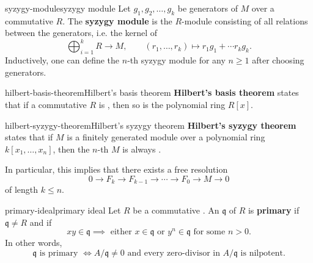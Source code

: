 \begin{topic}{syzygy-module}{syzygy module}
    Let $g_1, g_2, \ldots, g_k$ be generators of  $M$ over a commutative  $R$. The \textbf{syzygy module} is the $R$-module consisting of all relations between the generators, i.e. the kernel of
    \[ \bigoplus_{i = 1}^{k} R \to M, \qquad (r_1, \ldots, r_k) \mapsto r_1 g_1 + \cdots r_k g_k . \]
    Inductively, one can define the $n$-th syzygy module for any $n \ge 1$ after choosing generators.
\end{topic}

\begin{topic}{hilbert-basis-theorem}{Hilbert's basis theorem}
    \textbf{Hilbert's basis theorem} states that if a commutative  $R$ is , then so is the polynomial ring $R[x]$.
\end{topic}


\begin{topic}{hilbert-syzygy-theorem}{Hilbert's syzygy theorem}
    \textbf{Hilbert's syzygy theorem} states that if $M$ is a finitely generated module over a polynomial ring $k[x_1, \ldots, x_n]$, then the $n$-th  $M$ is always .
    
    In particular, this implies that there exists a free resolution
    \[ 0 \to F_k \to F_{k - 1} \to \cdots \to F_0 \to M \to 0 \]
    of length $k \le n$.
\end{topic}

\begin{topic}{primary-ideal}{primary ideal}
    Let $R$ be a commutative . An  $\mathfrak{q}$ of $R$ is \textbf{primary} if $\mathfrak{q} \ne R$ and if
    \[ xy \in \mathfrak{q} \implies \text{ either } x \in \mathfrak{q} \text{ or } y^n \in \mathfrak{q} \text{ for some } n > 0 . \]
    In other words,
    \[ \mathfrak{q} \text{ is primary } \iff A / \mathfrak{q} \ne 0 \text{ and every zero-divisor in } A / \mathfrak{q} \text{ is nilpotent} . \]
\end{topic}

